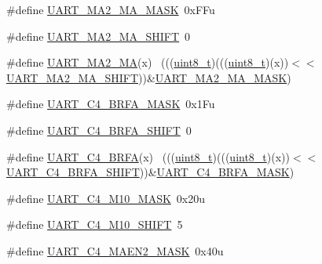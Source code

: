 \begin{DoxyCompactItemize}
\item 
\#define \hyperlink{group___u_a_r_t___register___masks_ga700f51ab869350daee42b8ae9c655ffd}{U\+A\+R\+T\+\_\+\+M\+A2\+\_\+\+M\+A\+\_\+\+M\+A\+SK}~0x\+F\+Fu
\item 
\#define \hyperlink{group___u_a_r_t___register___masks_ga1ecfe245065ed459b087fc0d629b3f07}{U\+A\+R\+T\+\_\+\+M\+A2\+\_\+\+M\+A\+\_\+\+S\+H\+I\+FT}~0
\item 
\#define \hyperlink{group___u_a_r_t___register___masks_gae9ee9c6d7f090dd59543a468f1493d65}{U\+A\+R\+T\+\_\+\+M\+A2\+\_\+\+MA}(x)                                                  ~(((\hyperlink{_p_e___types_8h_aba7bc1797add20fe3efdf37ced1182c5}{uint8\+\_\+t})(((\hyperlink{_p_e___types_8h_aba7bc1797add20fe3efdf37ced1182c5}{uint8\+\_\+t})(x))$<$$<$\hyperlink{group___u_a_r_t___register___masks_ga1ecfe245065ed459b087fc0d629b3f07}{U\+A\+R\+T\+\_\+\+M\+A2\+\_\+\+M\+A\+\_\+\+S\+H\+I\+FT}))\&\hyperlink{group___u_a_r_t___register___masks_ga700f51ab869350daee42b8ae9c655ffd}{U\+A\+R\+T\+\_\+\+M\+A2\+\_\+\+M\+A\+\_\+\+M\+A\+SK})
\item 
\#define \hyperlink{group___u_a_r_t___register___masks_ga2f0ab4e5358add87747c744f8ba324fb}{U\+A\+R\+T\+\_\+\+C4\+\_\+\+B\+R\+F\+A\+\_\+\+M\+A\+SK}~0x1\+Fu
\item 
\#define \hyperlink{group___u_a_r_t___register___masks_gae8cac47de1cbd8f8bd2cb10133e4f603}{U\+A\+R\+T\+\_\+\+C4\+\_\+\+B\+R\+F\+A\+\_\+\+S\+H\+I\+FT}~0
\item 
\#define \hyperlink{group___u_a_r_t___register___masks_gabb5bd76ed3b85ff1d95199471f59cb7b}{U\+A\+R\+T\+\_\+\+C4\+\_\+\+B\+R\+FA}(x)                                                ~(((\hyperlink{_p_e___types_8h_aba7bc1797add20fe3efdf37ced1182c5}{uint8\+\_\+t})(((\hyperlink{_p_e___types_8h_aba7bc1797add20fe3efdf37ced1182c5}{uint8\+\_\+t})(x))$<$$<$\hyperlink{group___u_a_r_t___register___masks_gae8cac47de1cbd8f8bd2cb10133e4f603}{U\+A\+R\+T\+\_\+\+C4\+\_\+\+B\+R\+F\+A\+\_\+\+S\+H\+I\+FT}))\&\hyperlink{group___u_a_r_t___register___masks_ga2f0ab4e5358add87747c744f8ba324fb}{U\+A\+R\+T\+\_\+\+C4\+\_\+\+B\+R\+F\+A\+\_\+\+M\+A\+SK})
\item 
\#define \hyperlink{group___u_a_r_t___register___masks_ga9e9d5093d6aec7bd4c3f418ee54f8801}{U\+A\+R\+T\+\_\+\+C4\+\_\+\+M10\+\_\+\+M\+A\+SK}~0x20u
\item 
\#define \hyperlink{group___u_a_r_t___register___masks_gafd4cf70aa0988a96e3744eae7a0f036d}{U\+A\+R\+T\+\_\+\+C4\+\_\+\+M10\+\_\+\+S\+H\+I\+FT}~5
\item 
\#define \hyperlink{group___u_a_r_t___register___masks_gac1c8fa0730a887b5d4d43f426b27c955}{U\+A\+R\+T\+\_\+\+C4\+\_\+\+M\+A\+E\+N2\+\_\+\+M\+A\+SK}~0x40u

\end{DoxyCompactItemize}
